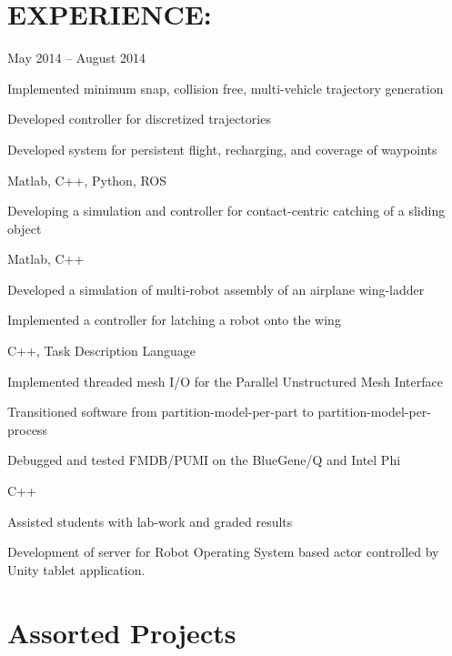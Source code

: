 \begin{resume}
 \section{EXPERIENCE:}      
    {May 2014 -- August 2014}
  {
    \item Implemented minimum snap, collision free, multi-vehicle trajectory
      generation
    \item Developed controller for discretized trajectories
    \item Developed system for persistent flight, recharging, and coverage of waypoints
    \item Matlab, C++, Python, ROS
  }
  {
    \item Developing a simulation and controller for contact-centric catching of a sliding object
    \item Matlab, C++
  }
  {
    \item Developed a simulation of multi-robot assembly of an airplane wing-ladder
    \item Implemented a controller for latching a robot onto the wing 
    \item C++, Task Description Language
  }
  {
		\item Implemented threaded mesh I/O for the Parallel Unstructured Mesh Interface
    \item Transitioned software from partition-model-per-part to partition-model-per-process
		\item Debugged and tested FMDB/PUMI on the BlueGene/Q and Intel Phi
    \item C++
  }
  {
		\item Assisted students with lab-work and graded results
  }
  {
		\item Development of server for Robot Operating System based actor
			controlled by Unity tablet application.
  }
\normalsize{\section{Assorted Projects}}

\end{resume}
